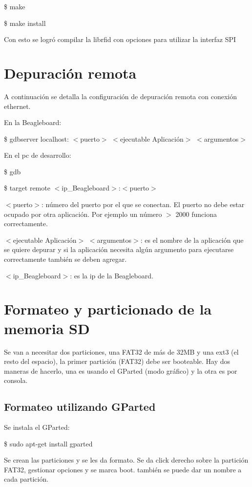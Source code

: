 \centerline{\$ make}

\centerline{\$ make install}

\bigskip
Con esto se logró compilar la librfid con opciones para utilizar la interfaz SPI


\section{Depuración remota}

A continuación se detalla la configuración de depuración remota con conexión ethernet.

\bigskip
En la Beagleboard:    

\bigskip                							
\centerline{\$ gdbserver localhost: $<$puerto$>$ $<$ejecutable Aplicación$>$ $<$argumentos$>$}

\bigskip
En el pc de desarrollo:

\bigskip
\centerline{\$ gdb}

\centerline{\$ target remote $<$ip\_Beagleboard$>$:$<$puerto$>$}

\bigskip
$<$puerto$>$: número del puerto por el que se conectan. El puerto no debe estar ocupado por otra aplicación. Por ejemplo un número $>$ 2000 funciona correctamente.

\bigskip
$<$ejecutable Aplicación$>$ $<$argumentos$>$: es el nombre de la aplicación que se quiere depurar y si la aplicación necesita algún argumento para ejecutarse correctamente también se deben agregar.

\bigskip
$<$ip\_Beagleboard$>$: es la ip de la Beagleboard.


\section{Formateo y particionado de la memoria SD}

Se van a necesitar dos particiones, una FAT32 de más de 32MB y una ext3 (el resto del espacio), la
primer partición (FAT32) debe ser booteable.
Hay dos maneras de hacerlo, una es usando el GParted (modo gráfico) y la otra es por consola.

\subsection{Formateo utilizando GParted}

Se instala el GParted:

\centerline{\$ sudo apt-get install gparted}

Se crean las particiones y se les da formato.
Se da click derecho sobre la partición FAT32, gestionar opciones y se marca boot. también se puede dar un nombre a cada partición.


